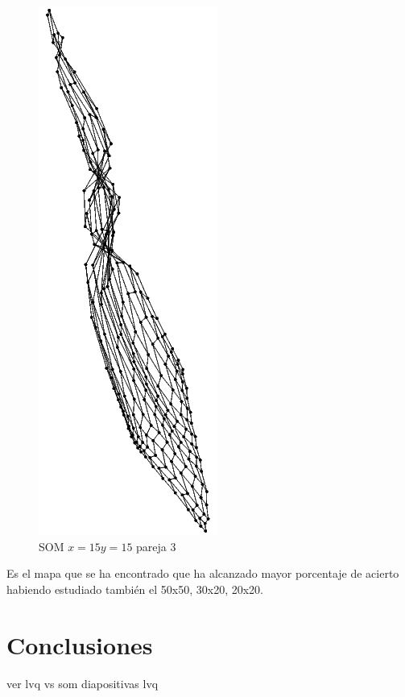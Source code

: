 \documentclass[11pt,spanish,listoffigures,listoftables]{workluis}
\begin{document}
\begin{figure}[H]
\centering
\includegraphics[scale=0.5]{som1515p3}
\caption{SOM $x=15 y=15$ pareja 3}
\end{figure} 

\par Es el mapa que se ha encontrado que ha alcanzado mayor porcentaje de acierto habiendo estudiado también el 50x50, 30x20, 20x20.





\chapter{Conclusiones}

ver lvq vs som diapositivas lvq
\end{document}

